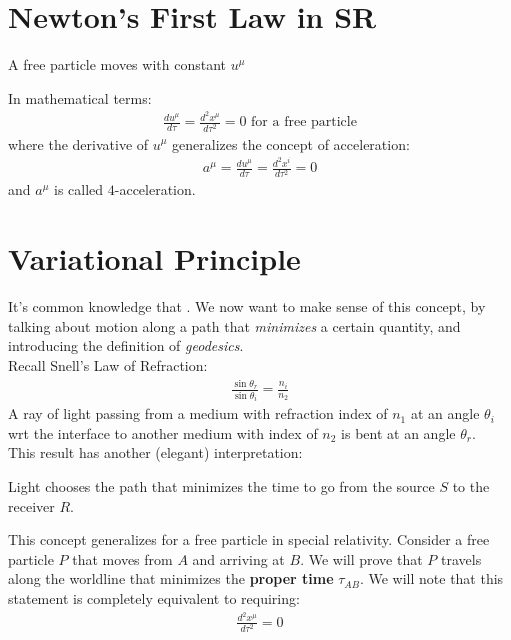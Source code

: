 \documentclass[../template.tex]{subfiles}
\begin{document}
\section{Newton's First Law in SR}
\begin{center}
    A free particle moves with constant $u^\mu$ 
\end{center}
In mathematical terms:
\begin{align*}
    \frac{du^\mu}{d \tau} = \frac{d^2 x^\mu}{d \tau^2} = 0 \text{ for a free particle}
\end{align*}
where the derivative of $u^\mu$ generalizes the concept of acceleration:
\begin{align*}
    a^\mu = \frac{d u^\mu}{d \tau} = \frac{d^2 x^i}{d \tau^2} = 0 
\end{align*} 
and $a^\mu$ is called $4$-acceleration.

\section{Variational Principle}
It's common knowledge that . We now want to make sense of this concept, by talking about motion along a path that \textit{minimizes} a certain quantity, and introducing the definition of \textit{geodesics}.\\

Recall Snell's Law of Refraction:
\begin{align*}
    \frac{\sin \theta_r}{\sin \theta_i} = \frac{n_i}{n_2}  
\end{align*}
A ray of light passing from a medium with refraction index of $n_1$ at an angle $\theta_i$ wrt the interface to another medium with index of $n_2$ is bent at an angle $\theta_r$.\\

This result has another (elegant) interpretation:
\begin{center}
    Light chooses the path that minimizes the time to go from the source $S$  to the receiver $R$.
\end{center}

This concept generalizes for a free particle in special relativity. Consider a free particle $P$  that moves from $A$ and arriving at $B$. We will prove that $P$ travels along the worldline that minimizes the \textbf{proper time} $\tau_{AB}$. We will note that this statement is completely equivalent to requiring:
\begin{align*}
    \frac{d^2 x^\mu}{d \tau^2} = 0 
\end{align*}  
\end{document}
